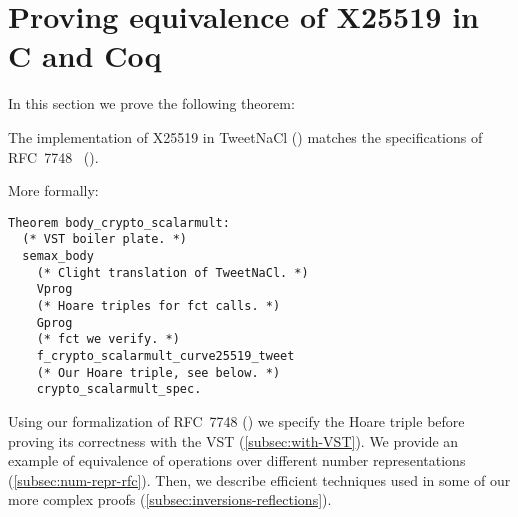 \section{Proving equivalence of X25519 in C and Coq}
\label{sec:C-Coq}

In this section we prove the following theorem:

\begin{informaltheorem}
The implementation of X25519 in TweetNaCl () matches
the specifications of RFC~7748~\cite{rfc7748} ().
\end{informaltheorem}

More formally:
\begin{lstlisting}[language=Coq]
Theorem body_crypto_scalarmult:
  (* VST boiler plate. *)
  semax_body
    (* Clight translation of TweetNaCl. *)
    Vprog
    (* Hoare triples for fct calls. *)
    Gprog
    (* fct we verify. *)
    f_crypto_scalarmult_curve25519_tweet
    (* Our Hoare triple, see below. *)
    crypto_scalarmult_spec.
\end{lstlisting}

Using our formalization of RFC~7748 () we specify the Hoare
triple before proving its correctness with the VST (\ref{subsec:with-VST}).
We provide an example of equivalence of operations over different number
representations (\ref{subsec:num-repr-rfc}).
Then, we describe efficient techniques
used in some of our more complex proofs (\ref{subsec:inversions-reflections}).
